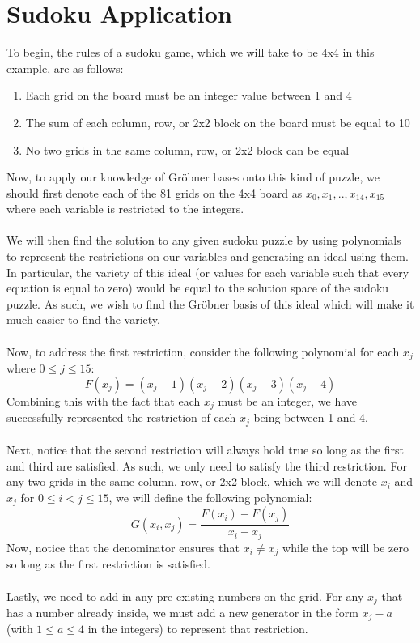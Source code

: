 \documentclass[11pt]{article}
\begin{document}
\section{Sudoku Application}
To begin, the rules of a sudoku game, which we will take to be 4x4 in this example, are as follows:
\begin{enumerate}
    \item Each grid on the board must be an integer value between 1 and 4
    \item The sum of each column, row, or 2x2 block on the board must be equal to 10
    \item No two grids in the same column, row, or 2x2 block can be equal
\end{enumerate}
Now, to apply our knowledge of Gröbner bases onto this kind of puzzle, we should first denote each of the 81 grids on the 4x4 board as $x_0, x_1, .. , x_{14}, x_{15}$ where each variable is restricted to the integers. 
\\ \\ We will then find the solution to any given sudoku puzzle by using polynomials to represent the restrictions on our variables and generating an ideal using them. In particular, the variety of this ideal (or values for each variable such that every equation is equal to zero) would be equal to the solution space of the sudoku puzzle. As such, we wish to find the Gröbner basis of this ideal which will make it much easier to find the variety. 
\\ \\ Now, to address the first restriction, consider the following polynomial for each $x_j$ where $0 \leq j \leq 15$:
\[F(x_j) = (x_j - 1)(x_j-2)(x_j-3)(x_j-4)\]
Combining this with the fact that each $x_j$ must be an integer, we have successfully represented the restriction of each $x_j$ being between 1 and 4.
\\ \\ Next, notice that the second restriction will always hold true so long as the first and third are satisfied. As such, we only need to satisfy the third restriction. For any two grids in the same column, row, or 2x2 block, which we will denote $x_i$ and $x_j$ for $0 \leq i < j \leq 15$, we will define the following polynomial:
\[G(x_i, x_j) = \frac{F(x_i) - F(x_j)}{x_i-x_j}\]
Now, notice that the denominator ensures that $x_i \neq x_j$ while the top will be zero so long as the first restriction is satisfied.
\\ \\ Lastly, we need to add in any pre-existing numbers on the grid. For any $x_j$ that has a number already inside, we must add a new generator in the form $x_j - a$ (with $1 \leq a \leq 4$ in the integers) to represent that restriction. 
\end{document}
